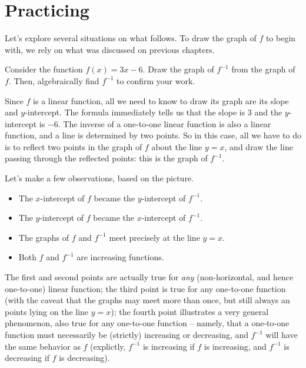 \documentclass[nooutcomes]{ximera}
\begin{document}
\section{Practicing}

Let's explore several situations on what follows. To draw the graph of $f$ to begin with, we rely on what was discussed on previous chapters.

\begin{example}
  Consider the function $f(x)=3x-6$. Draw the graph of $f^{-1}$ from the graph of $f$. Then, algebraically find $f^{-1}$ to confirm your work.
  
  \begin{explanation}
    Since $f$ is a linear function, all we need to know to draw its graph are its slope and $y$-intercept. The formula immediately tells us that the slope is $3$ and the $y$-intercept is $-6$. The inverse of a one-to-one linear function is also a linear function, and a line is determined by two points. So in this case, all we have to do is to reflect two points in the graph of $f$ about the line $y=x$, and draw the line passing through the reflected points: this is the graph of $f^{-1}$.

    \begin{image}
    \end{image}
    Let's make a few observations, based on the picture.
    \begin{itemize}
    \item The $x$-intercept of $f$ became the $y$-intercept of $f^{-1}$.
    \item The $y$-intercept of $f$ became the $x$-intercept of $f^{-1}$.
    \item The graphs of $f$ and $f^{-1}$ meet precisely at the line $y=x$.
    \item Both $f$ and $f^{-1}$ are increasing functions.
    \end{itemize}
    The first and second points are actually true for \emph{any} (non-horizontal, and hence one-to-one) linear function; the third point is true for any one-to-one function (with the caveat that the graphs may meet more than once, but still always an points lying on the line $y=x$); the fourth point illustrates a very general phenomenon, also true for any one-to-one function -- namely, that a one-to-one function must necessarily be (strictly) increasing or decreasing, and $f^{-1}$ will have the same behavior as $f$ (explictly, $f^{-1}$ is increasing if $f$ is increasing, and $f^{-1}$ is decreasing if $f$ is decreasing).


\end{explanation}
\end{example}
\end{document}
